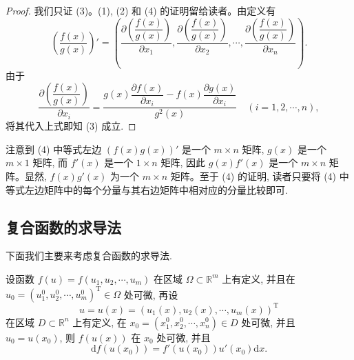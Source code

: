 \begin{proof}
我们只证 (3)。(1), (2) 和 (4) 的证明留给读者。由定义有
\[
  \left(\frac{f(x)}{g(x)}\right)'=
  \left(
    \frac{\partial\left(\dfrac{f(x)}{g(x)}\right)}{\partial x_1},
    \frac{\partial\left(\dfrac{f(x)}{g(x)}\right)}{\partial x_2},
    \cdots,
    \frac{\partial\left(\dfrac{f(x)}{g(x)}\right)}{\partial x_n}
  \right).
\]
由于
\[
  \frac{\partial\left(\dfrac{f(x)}{g(x)}\right)}{\partial x_i}
  =
  \frac{g(x)\dfrac{\partial f(x)}{\partial x_i}-f(x)\dfrac{\partial g(x)}{\partial x_i}}{g^2(x)}
  \quad (i=1,2,\cdots,n),
\]
将其代入上式即知 (3) 成立.
\end{proof}


\begin{remark}\label{remark:ma-14-source-35}
注意到 (4) 中等式左边 $(f(x)g(x))'$ 是一个 $m\times n$ 矩阵, $g(x)$ 是一个 $m\times1$ 矩阵, 而 $f'(x)$ 是一个 $1\times n$ 矩阵, 因此 $g(x)f'(x)$ 是一个 $m\times n$ 矩阵。显然, $f(x)g'(x)$ 为一个 $m\times n$ 矩阵。至于 (4) 的证明, 读者只要将 (4) 中等式左边矩阵中的每个分量与其右边矩阵中相对应的分量比较即可.
\end{remark}


\subsection{复合函数的求导法}
\label{subsec:ma-14-2-2}

下面我们主要来考虑复合函数的求导法.

\begin{theorem}\label{theorem:ma-14-2-2}
设函数 $f(u)=f(u_1,u_2,\cdots,u_m)$ 在区域 $\Omega\subset\mathbb R^m$ 上有定义, 并且在 $u_0=(u_1^0,u_2^0,\cdots,u_m^0)^\mathrm T\in\Omega$ 处可微, 再设
\[
  u=u(x)=(u_1(x),u_2(x),\cdots,u_m(x))^\mathrm T
\]
在区域 $D\subset\mathbb R^n$ 上有定义, 在 $x_0=(x_1^0,x_2^0,\cdots,x_n^0)\in D$ 处可微, 并且 $u_0=u(x_0)$, 则 $f(u(x))$ 在 $x_0$ 处可微, 并且
\[
  \mathrm df(u(x_0))=f'(u(x_0))u'(x_0)\mathrm dx.
\]
\end{theorem}


